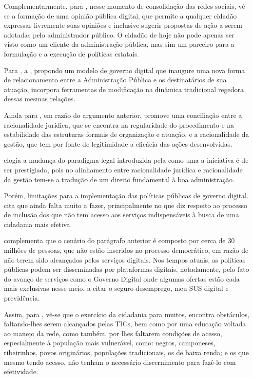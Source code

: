 Complementarmente, para \cite{carvalho2022nova}, nesse momento de consolidação das redes sociais, vê-se a formação de uma opinião pública digital, que permite a qualquer cidadão expressar livremente suas opiniões e inclusive sugerir propostas de ação a serem adotadas pelo administrador público. O cidadão de hoje não pode apenas ser visto como um cliente da administração pública, mas sim um parceiro para a formulação e a execução de políticas estatais.

Para \cite{do2022governo}, a , propondo um modelo de governo digital que inaugure uma nova forma de relacionamento entre a Administração Pública e os destinatários de sua atuação, incorpora ferramentas de modificação na dinâmica tradicional regedora dessas mesmas relações.

Ainda para \cite{do2022governo}, em razão do argumento anterior, promove uma conciliação entre a racionalidade jurídica, que se encontra na regularidade do procedimento e na estabilidade das estruturas formais de organização e atuação, e a racionalidade da gestão, que tem por fonte de legitimidade a eficácia das ações desenvolvidas. 

\cite{do2022governo} elogia a mudança do paradigma legal introduzida pela  como uma a iniciativa é de ser prestigiada, pois no alinhamento entre racionalidade jurídica e racionalidade da gestão tem-se a tradução de um direito fundamental à boa administração.

Porém, limitações para a implementação das políticas públicas de governo digital. \cite{reck2021transformaccao} cita que ainda falta muito a fazer, principalmente no que diz respeito ao processo de inclusão dos que não tem acesso aos serviços indispensáveis à busca de uma cidadania mais efetiva. 

\cite{reck2021transformaccao} complementa que o cenário do parágrafo anterior é composto por cerca de 30 milhões de pessoas, que não estão inseridos no processo democrático, em razão de não terem sido alcançados pelos serviços digitais.  Nos tempos atuais, as políticas públicas podem ser disseminadas por plataformas digitais, notadamente, pelo fato do avanço de serviços como o Governo Digital onde algumas ofertas estão cada mais exclusivas nesse meio, a citar o seguro-desemprego, meu SUS digital e previdência.

Assim, para  \cite{reck2021transformaccao}, vê-se que o exercício da cidadania para muitos, encontra obstáculos, faltando-lhes serem alcançados pelas TICs, bem como por uma educação voltada ao manejo da rede, como também, por lhes faltarem condições de acesso, especialmente à população mais vulnerável, como: negros, camponeses, ribeirinhos, povos originários, populações tradicionais, os de baixa renda; e os que mesmo tendo acesso, não tenham o necessário discernimento para fazê-lo com efetividade.


